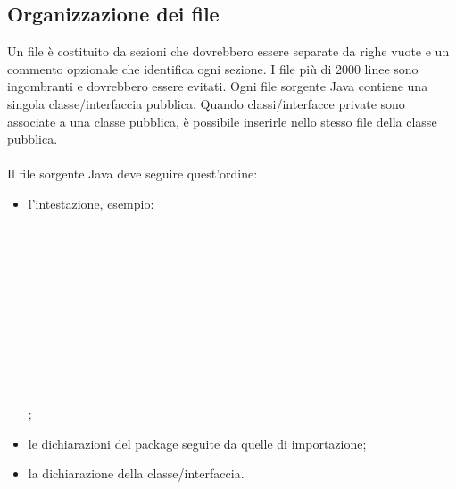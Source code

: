 \subsection{Organizzazione dei file}
Un file \`e costituito da sezioni che dovrebbero essere separate da righe vuote
e un commento opzionale che identifica ogni sezione. I file pi\`u di 2000 linee sono
ingombranti e dovrebbero essere evitati.
Ogni file sorgente Java contiene una singola classe/interfaccia pubblica.
Quando classi/interfacce private sono associate a una classe pubblica,
\`e possibile inserirle nello stesso file della classe pubblica.
\\ \\
Il file sorgente Java deve seguire quest'ordine:
\begin{itemize}
  \item l'intestazione, esempio: \\
  \hspace*{0.5cm} \co{//} \\
  \hspace*{0.5cm}  \\
  \hspace*{0.5cm} \co{//} \\
  \hspace*{0.5cm}  \\
  \hspace*{0.5cm} \co{//} \\
  \hspace*{0.5cm}  \\
  \hspace*{0.5cm} \co{//} \\
  \hspace*{0.5cm}  \\
  \hspace*{0.5cm} \co{//} \\
  \hspace*{0.5cm}  \\
  \hspace*{0.5cm} \co{//} \\
  ;
  \item le dichiarazioni del package seguite da quelle di importazione;
  \item la dichiarazione della classe/interfaccia.
\end{itemize}

